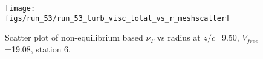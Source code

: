 \begin{figure}[H]
\centering
\texttt{[image: figs/run\_53/run\_53\_turb\_visc\_total\_vs\_r\_meshscatter]}
\caption{Scatter plot of non-equilibrium based $\nu_T$ vs radius at $z/c$=9.50, $V_{free}$=19.08, station 6.}
\label{fig:run_53_turb_visc_total_vs_r_meshscatter}
\end{figure}


